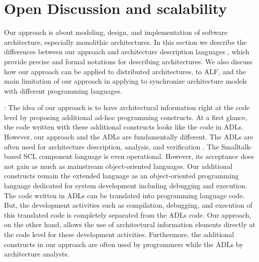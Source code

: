 \section{Open Discussion and scalability}
\label{sec:discussion}
Our approach is about modeling, design, and implementation of software architecture, especially monolithic architectures.
In this section we describe the differences between our approach and architecture description languages \cite{medvidovic2000classification}, which provide precise and formal notations for describing architectures.
We also discuss how our approach can be applied to distributed architectures, to ALF, and the main limitation of our approach in applying to synchronize architecture models with different programming languages.  

\noindent
{}:
The idea of our approach is to have architectural information right at the code level by proposing additional ad-hoc programming constructs.%
At a first glance, the code written with these additional constructs looks like the code in ADLs.
However, our approach and the ADLs are fundamentally different.
The ADLs are often used for architecture description, analysis, and verification \cite{robbins1998integrating}. 
The Smalltalk-based SCL component language \cite{fabresse2006scl} is even operational.
However, its acceptance does not gain as much as mainstream object-oriented languages.
Our additional constructs remain the extended language as an object-oriented programming language dedicated for system development including debugging and execution.
The code written in ADLs can be translated into programming language code. 
But, the development activities such as compilation, debugging, and execution of this translated code is completely separated from the ADLs code.
Our approach, on the other hand, allows the use of architectural information elements directly at the code level for these development activities. 
Furthermore, the additional constructs in our approach are often used by programmers while the ADLs by architecture analysts.

